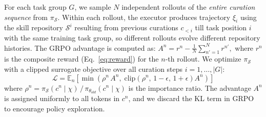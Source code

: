 For each task group $G$, we sample $N$ independent rollouts of the \emph{entire curation sequence} from $\pi_{\mathcal{S}}$. Within each rollout, the executor produces trajectory $\xi_i$ using the skill repository $\mathcal{S}^{i}$ resulting from previous curations $c_{<i}$ till task position $i$ with the same training task group, so different rollouts evolve different repository histories. The GRPO advantage is computed as:
$     A^{n} = r^{n} - \frac{1}{N}\sum_{n'=1}^{N} r^{n'},$
where $r^{n}$ is the composite reward (Eq.~\ref{eq:reward}) for the $n$-th rollout.
We optimize $\pi_{\mathcal{S}}$ with a clipped surrogate objective over all curation steps $i = 1, \ldots, |G|$:
\begin{equation}
    \mathcal{L} = \mathbb{E}_{n} \!\left[\min\!\left(\rho^{n}\,A^{n},\; \mathrm{clip}\!\left(\rho^{n},\, 1{-}\epsilon,\, 1{+}\epsilon\right)\!A^{n}\right)\right]
    \label{eq:grpo}
\end{equation}
where $\rho^{n} = \pi_{\mathcal{S}}(c^{n} \mid \chi) \,/\, \pi_{\theta_{old}}(c^{n} \mid \chi)$ is the importance ratio. The advantage $A^{n}$ is assigned uniformly to all tokens in $c^{n}$, and we discard the KL term in GRPO to encourage policy exploration.
